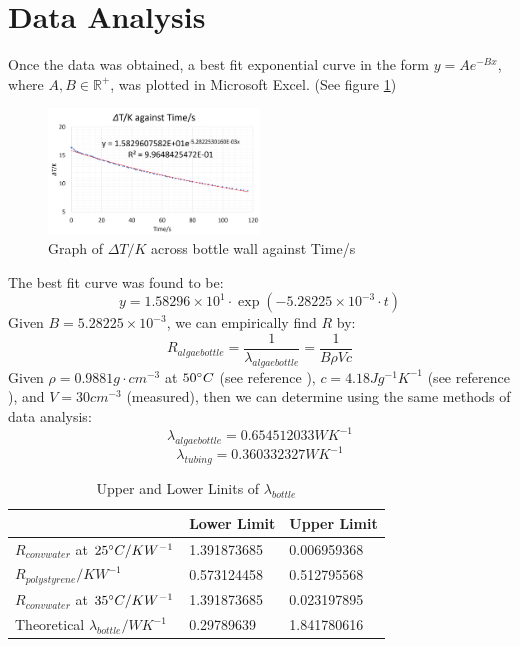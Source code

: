 \documentclass[10pt,a4paper]{IEEEtran}
\begin{document}
	\section{Data Analysis}
	Once the data was obtained, a best fit exponential curve in the form $y = Ae^{-Bx}$, where $A, B \in \mathbb{R^{+}}$, was plotted in Microsoft Excel. (See figure \ref{fig:graph_lambdaBottle})
	\begin{figure}[H]
		\begin{center}
			\includegraphics[width=0.5\textwidth]{graph_lambdaBottle.png}
			\caption{Graph of $\Delta T/K$ across bottle wall against Time/s}
			\label{fig:graph_lambdaBottle}
		\end{center}
	\end{figure} 
	The best fit curve was found to be: 
	$$y = 1.58296 \times 10^{1} \cdot \exp(-5.28225\times 10^{-3}\cdot t)$$
	Given $B = 5.28225\times 10^{-3}$, we can empirically find $R$ by:
	$$R_{algae bottle} = \frac{1}{\lambda_{algae bottle}} = \frac{1}{B \rho V c}$$
	Given $\rho = 0.9881 g \cdot cm^{-3}$ at $50 \degree C$ (see reference \cite{waterDensity}), $c = 4.18 J g^{-1} K^{-1}$ (see reference \cite{waterHeatCap}), and $V = 30 cm^{-3}$ (measured), then we can determine using the same methods of data analysis:
	$$\lambda_{algae bottle} = 0.654512033 W K^{-1}$$
	$$\lambda_{tubing} = 0.360332327W K^{-1}$$
	\begin{table}[H]
		\centering
		\begin{tabular}{|l|l|l|}
			\hline
			& Lower Limit & Upper Limit \\ \hline
			\multicolumn{1}{|c|}{$R_{conv water}$ at $25 \degree C / KW^{-1}$} & 1.391873685 & 0.006959368 \\ \hline
			$R_{polystyrene}/ KW^{-1}$                                       & 0.573124458 & 0.512795568 \\ \hline
			$R_{conv water}$ at $35 \degree C / KW^{-1}$                       & 1.391873685 & 0.023197895 \\ \hline
			Theoretical $\lambda_{bottle}/WK^{-1}$ & 0.29789639  & 1.841780616 \\ \hline
		\end{tabular}
		\caption{Upper and Lower Linits of $\lambda_{bottle}$}
		\label{lambdaUpperAndLowerLimits}
	\end{table}
	
\end{document}
